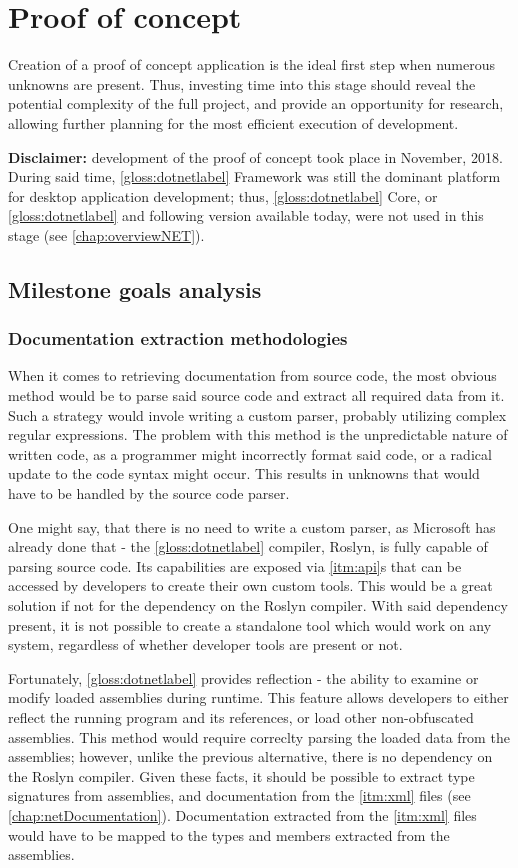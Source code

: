\chapter{Proof of concept}

Creation of a proof of concept application is the ideal first step when numerous unknowns are present. Thus, investing time into this stage should reveal the potential complexity of the full project, and provide an opportunity for research, allowing further planning for the most efficient execution of development.

\textbf{Disclaimer:}
development of the proof of concept took place in November, 2018. During said time, \ref{gloss:dotnetlabel} Framework was still the dominant platform for desktop application development; thus, \ref{gloss:dotnetlabel} Core, or \ref{gloss:dotnetlabel} and following version available today, were not used in this stage (see \ref{chap:overviewNET}).

\section{Milestone goals analysis}

\subsection{Documentation extraction methodologies}
When it comes to retrieving documentation from source code, the most obvious method would be to parse said source code and extract all required data from it. Such a strategy would invole writing a custom parser, probably utilizing complex regular expressions. The problem with this method is the unpredictable nature of written code, as a programmer might incorrectly format said code, or a radical update to the code syntax might occur. This results in unknowns that would have to be handled by the source code parser.

One might say, that there is no need to write a custom parser, as Microsoft has already done that - the \ref{gloss:dotnetlabel} compiler, Roslyn, is fully capable of parsing source code. Its capabilities are exposed via \ref{itm:api}s that can be accessed by developers to create their own custom tools. This would be a great solution if not for the dependency on the Roslyn compiler. With said dependency present, it is not possible to create a standalone tool which would work on any system, regardless of whether developer tools are present or not.

Fortunately, \ref{gloss:dotnetlabel} provides reflection - the ability to examine or modify loaded assemblies during runtime. This feature allows developers to either reflect the running program and its references, or load other non-obfuscated assemblies. This method would require correclty parsing the loaded data from the assemblies; however, unlike the previous alternative, there is no dependency on the Roslyn compiler. Given these facts, it should be possible to extract type signatures from assemblies, and documentation from the \ref{itm:xml} files (see \ref{chap:netDocumentation}). Documentation extracted from the \ref{itm:xml} files would have to be mapped to the types and members extracted from the assemblies.

